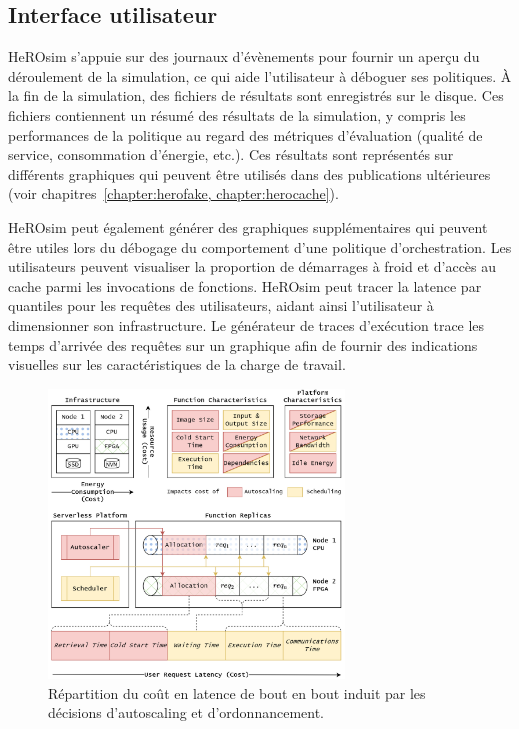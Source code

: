 \subsection{Interface utilisateur}

HeROsim s'appuie sur des journaux d'évènements pour fournir un aperçu du déroulement de la simulation, ce qui aide l'utilisateur à déboguer ses politiques. À la fin de la simulation, des fichiers de résultats sont enregistrés sur le disque. Ces fichiers contiennent un résumé des résultats de la simulation, y compris les performances de la politique au regard des métriques d'évaluation (qualité de service, consommation d'énergie, etc.). Ces résultats sont représentés sur différents graphiques qui peuvent être utilisés dans des publications ultérieures (voir chapitres~\ref{chapter:herofake, chapter:herocache}).

HeROsim peut également générer des graphiques supplémentaires qui peuvent être utiles lors du débogage du comportement d'une politique d'orchestration. Les utilisateurs peuvent visualiser la proportion de démarrages à froid et d'accès au cache parmi les invocations de fonctions. HeROsim peut tracer la latence par quantiles pour les requêtes des utilisateurs, aidant ainsi l'utilisateur à dimensionner son infrastructure. Le générateur de traces d'exécution trace les temps d'arrivée des requêtes sur un graphique afin de fournir des indications visuelles sur les caractéristiques de la charge de travail.

\begin{figure}[!ht]
    \centering
    \includegraphics[width=0.7\textwidth]{6_Chapitre6/figures/serverless-cost.png}
    \caption{Répartition du coût en latence de bout en bout induit par les décisions d'autoscaling et d'ordonnancement.}
\label{figure:herosim-cost}
\end{figure}

